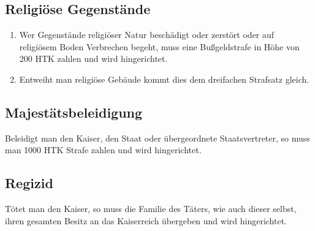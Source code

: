\documentclass{article}
\begin{document}
\subsection{Religiöse Gegenstände}
\begin{enumerate}[(1)]
    \item Wer Gegenstände religiöser Natur beschädigt oder zerstört oder auf religiösem Boden Verbrechen begeht, muss eine Bußgeldstrafe in Höhe von 200 HTK zahlen und wird hingerichtet.
    \item Entweiht man religiöse Gebäude kommt dies dem dreifachen Strafsatz gleich.
\end{enumerate}

\subsection{Majestätsbeleidigung}
Beleidigt man den Kaiser, den Staat oder übergeordnete Staatsvertreter, so muss man 1000 HTK Strafe zahlen und wird hingerichtet.

\subsection{Regizid}
Tötet man den Kaiser, so muss die Familie des Täters, wie auch dieser selbst, ihren gesamten Besitz an das Kaiserreich übergeben und wird hingerichtet.
\end{document}
